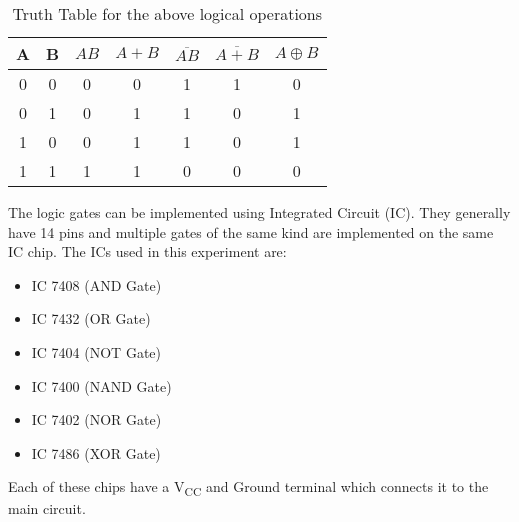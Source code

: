 \documentclass{scrartcl}
\begin{document}
\begin{table}[H]
    \centering
    \label{tab:truth_table}
    \renewcommand{\arraystretch}{1.5} %
    \begin{tabular}{|c|c||c|c|c|c|c|}
    \hline
    \textbf{A} & \textbf{B} & {$AB$} & {$A + B$} & {$\overline{AB}$} & {$\overline{A+B}$} & {$A \oplus B$} \\
    \hline
    0 & 0 & 0 & 0 & 1 & 1 & 0 \\
    0 & 1 & 0 & 1 & 1 & 0 & 1 \\
    1 & 0 & 0 & 1 & 1 & 0 & 1 \\
    1 & 1 & 1 & 1 & 0 & 0 & 0 \\
    \hline
    \end{tabular}
    \renewcommand{\arraystretch}{1} %
    \caption{Truth Table for the above logical operations}
\end{table}
The logic gates can be implemented using Integrated Circuit (IC). They generally have 14 pins and multiple gates of the same kind are implemented on the same IC chip. The ICs used in this experiment are:
\begin{itemize}
    \item  IC 7408 (AND Gate)
    \item IC 7432 (OR Gate)
    \item IC 7404 (NOT Gate)
    \item IC 7400 (NAND Gate)
    \item IC 7402 (NOR Gate)
    \item IC 7486 (XOR Gate)

\end{itemize}
 Each of these chips have a V\textsubscript{CC} and Ground terminal which connects it to the main circuit. 
\end{document}
